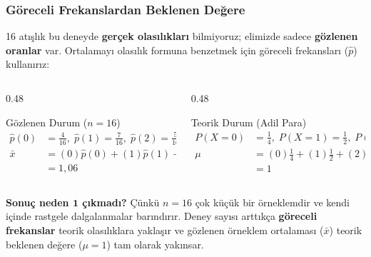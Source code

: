 \documentclass[light]{lutbeamer}
\begin{document}
\begin{frame}[fragile]
  \frametitle[Göreceli Frekanslar]{Göreceli Frekanslardan Beklenen Değere}

  \justifying{}
  \small
  16 atışlık bu deneyde \textbf{gerçek olasılıkları} bilmiyoruz; elimizde sadece \textbf{gözlenen oranlar} var. Ortalamayı olasılık formuna benzetmek için göreceli frekansları ($\hat{p}$) kullanırız:

  \vspace{0.5em}
  \begin{columns}[T]
    \begin{column}{0.48\textwidth}
      \begin{block}{Gözlenen Durum ($n=16$)}
        \vspace{-1em}
        {\footnotesize
        \begin{align*}
          \hat{p}(0) &= \frac{4}{16},\; \hat{p}(1) = \frac{7}{16},\; \hat{p}(2) = \frac{5}{16} \\[0.5em]
          \bar{x} &= (0)\hat{p}(0) + (1)\hat{p}(1) + (2)\hat{p}(2) \\
                  &= 1{,}06
        \end{align*}
        }
      \end{block}
    \end{column}
    \begin{column}{0.48\textwidth}
      \begin{exampleblock}{Teorik Durum (Adil Para)}
        \vspace{-1em}
        {\footnotesize
        \begin{align*}
          P(X=0) &= \frac{1}{4},\; P(X=1) = \frac{1}{2},\; P(X=2) = \frac{1}{4} \\[0.5em]
          \mu &= (0)\frac{1}{4} + (1)\frac{1}{2} + (2)\frac{1}{4} \\
              &= 1
        \end{align*}
        }
      \end{exampleblock}
    \end{column}
  \end{columns}

  \vspace{0.5em}
  \begin{center}
    \begin{minipage}{0.98\textwidth}
      \footnotesize
      \textbf{Sonuç neden $\mathbf{1}$ çıkmadı?} Çünkü $n=16$ çok küçük bir örneklemdir ve kendi içinde rastgele dalgalanmalar barındırır. Deney sayısı arttıkça \textbf{göreceli frekanslar} teorik olasılıklara yaklaşır ve gözlenen örneklem ortalaması ($\bar{x}$) teorik beklenen değere ($\mu=1$) tam olarak yakınsar.
    \end{minipage}
  \end{center}
\end{frame}
\end{document}

